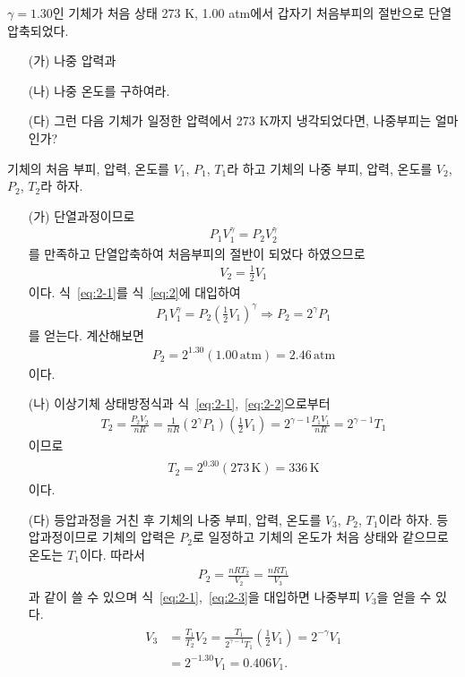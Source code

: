 \documentclass[floatfix,nofootinbib,superscriptaddress,fleqn]{revtex4}
\begin{document}
$\gamma=1.30$인 기체가 처음 상태 273 
K, 1.00 atm에서 갑자기 처음부피의 절반으로 단열압축되었다.
\begin{itemize}
\item[(가)] 나중 압력과
\item[(나)] 나중 온도를 구하여라. 
\item[(다)] 그런 다음 기체가 일정한 압력에서 273 K까지 냉각되었다면,
  나중부피는 얼마인가?   
\end{itemize}
\vspace{1cm}
기체의 처음 부피, 압력, 온도를 $V_1$, $P_1$, $T_1$라 하고
기체의 나중 부피, 압력, 온도를 $V_2$, $P_2$, $T_2$라 하자. 
\begin{itemize}
  \item[(가)] 
단열과정이므로
\begin{align}\label{eq:2}
  P_1V_1^\gamma = P_2V_2^\gamma
\end{align}
를 만족하고 단열압축하여 처음부피의 절반이 되었다 하였으므로
\begin{align}\label{eq:2-1}
  V_2 = \frac{1}{2}V_1
\end{align} 
이다. 식~\eqref{eq:2-1}를 식~\eqref{eq:2}에 대입하여
\begin{align}\label{eq:2-2}
  P_1V_1^\gamma = P_2\left(\frac{1}{2}V_1\right)^\gamma  
  \Longrightarrow P_2 =2^\gamma P_1
\end{align}
를 얻는다. 계산해보면
\begin{align}
  P_2 = 2^{1.30}(1.00\,\mathrm{atm}) = 2.46\,\mathrm{atm}
\end{align}
이다.
  \item[(나)] 
  이상기체 상태방정식과 식~\eqref{eq:2-1},~\eqref{eq:2-2}으로부터
  \begin{align}\label{eq:2-3}
    T_2 = \frac{P_2V_2}{nR}
    =\frac{1}{nR}\left(2^{\gamma }P_1\right)\left(\frac{1}{2}V_1\right)
    =2^{\gamma-1}\frac{P_1V_1}{nR}
    =2^{\gamma-1}T_1
  \end{align}
  이므로
  \begin{align}
    \begin{split}
      T_2 = 2^{0.30}(273\,\mathrm{K}) = 336\,\mathrm{K}
    \end{split}
  \end{align}
  이다.
  \item[(다)]
  등압과정을 거친 후 기체의 나중 부피, 압력, 온도를 $V_3$, $P_2$, $T_1$이라 하자. 
  등압과정이므로 기체의 압력은 $P_2$로 일정하고 기체의 온도가 처음 상태와 같으므로 온도는
  $T_1$이다. 따라서
  \begin{align}
    P_2 = \frac{nRT_2}{V_2} = \frac{nRT_1}{V_3}
  \end{align}
  과 같이 쓸 수 있으며 식~\eqref{eq:2-1},~\eqref{eq:2-3}을 대입하면 나중부피 $V_3$을 얻을 수 있다.
  \begin{align}
    \begin{split}
      V_3 &= \frac{T_1}{T_2}V_2 = \frac{T_1}{2^{\gamma-1}T_1}\left(\frac{1}{2}V_1\right)
      =2^{-\gamma}V_1 \\
      &= 2^{-1.30}V_1 = 0.406V_1.
    \end{split}
  \end{align}
  \end{itemize}
\end{document}
